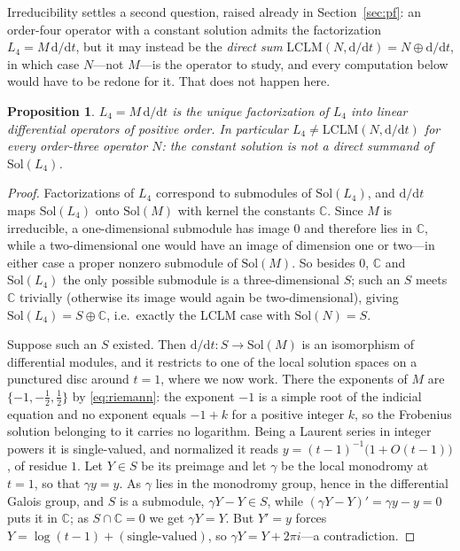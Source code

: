 \documentclass[11pt]{article}
\newcommand{\rmd}{\mathrm{d}}
\theoremstyle{plain}
\newtheorem{prop}[thm]{Proposition}
\theoremstyle{remark}
\begin{document}
Irreducibility settles a second question, raised already in Section~\ref{sec:pf}: an order-four operator
with a constant solution admits the factorization $L_4=M\,\rmd/\rmd t$, but it may instead be the
\emph{direct sum} $\mathrm{LCLM}(N,\rmd/\rmd t)=N\oplus\rmd/\rmd t$, in which case $N$---not $M$---is the
operator to study, and every computation below would have to be redone for it. That does not happen here.

\begin{prop}\label{prop:unique}
$L_4=M\,\rmd/\rmd t$ is the unique factorization of $L_4$ into linear differential operators of positive
order. In particular $L_4\neq\mathrm{LCLM}(N,\rmd/\rmd t)$ for every order-three operator $N$: the constant
solution is not a direct summand of $\mathrm{Sol}(L_4)$.
\end{prop}

\begin{proof}
Factorizations of $L_4$ correspond to submodules of $\mathrm{Sol}(L_4)$, and $\rmd/\rmd t$ maps
$\mathrm{Sol}(L_4)$ onto $\mathrm{Sol}(M)$ with kernel the constants $\mathbb{C}$. Since $M$ is irreducible, a
one-dimensional submodule has image $0$ and therefore lies in $\mathbb{C}$, while a two-dimensional one would
have an image of dimension one or two---in either case a proper nonzero submodule of $\mathrm{Sol}(M)$. So besides $0$, $\mathbb{C}$ and
$\mathrm{Sol}(L_4)$ the only possible submodule is a three-dimensional $S$; such an $S$ meets $\mathbb{C}$
trivially (otherwise its image would again be two-dimensional), giving $\mathrm{Sol}(L_4)=S\oplus\mathbb{C}$,
i.e.\ exactly the LCLM case with $\mathrm{Sol}(N)=S$.

Suppose such an $S$ existed. Then $\rmd/\rmd t\colon S\to\mathrm{Sol}(M)$ is an isomorphism of differential
modules, and it restricts to one of the local solution spaces on a punctured disc around $t=1$, where we now
work. There the exponents of $M$ are $\{-1,-\tfrac12,\tfrac12\}$ by \eqref{eq:riemann}: the exponent $-1$ is a
simple root of the indicial equation and no exponent equals $-1+k$ for a positive integer $k$, so the Frobenius
solution belonging to it carries no logarithm. Being a Laurent series in integer powers it is single-valued,
and normalized it reads $y=(t-1)^{-1}\big(1+O(t-1)\big)$, of residue $1$.
Let $Y\in S$ be its preimage and let $\gamma$ be the local monodromy at $t=1$, so that $\gamma y=y$. As $\gamma$
lies in the monodromy group, hence in the differential Galois group, and $S$ is a submodule,
$\gamma Y-Y\in S$, while $(\gamma Y-Y)'=\gamma y-y=0$ puts it in $\mathbb{C}$; as $S\cap\mathbb{C}=0$ we get
$\gamma Y=Y$. But $Y'=y$ forces $Y=\log(t-1)+(\text{single-valued})$, so $\gamma Y=Y+2\pi i$---a contradiction.
\end{proof}
\end{document}
